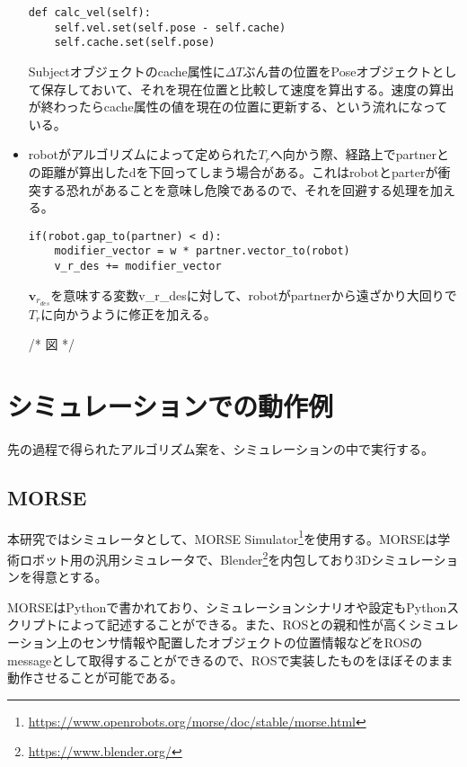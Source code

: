 \documentclass{kuisthesis}
\begin{document}
\begin{itemize}
\begin{lstlisting}
def calc_vel(self):
	self.vel.set(self.pose - self.cache)
	self.cache.set(self.pose)
\end{lstlisting}

Subjectオブジェクトのcache属性に$\Delta T$ぶん昔の位置をPoseオブジェクトとして保存しておいて、それを現在位置と比較して速度を算出する。速度の算出が終わったらcache属性の値を現在の位置に更新する、という流れになっている。

\vspace{1.0em}

\item robotがアルゴリズムによって定められた$T_r$へ向かう際、経路上でpartnerとの距離が算出したdを下回ってしまう場合がある。これはrobotとparterが衝突する恐れがあることを意味し危険であるので、それを回避する処理を加える。

\begin{lstlisting}
if(robot.gap_to(partner) < d):
	modifier_vector = w * partner.vector_to(robot)
	v_r_des += modifier_vector
\end{lstlisting}

$\bm{v}_r_{des}$を意味する変数v\_r\_desに対して、robotがpartnerから遠ざかり大回りで$T_r$に向かうように修正を加える。

/* 図 */

\end{itemize}




\section{シミュレーションでの動作例}

先の過程で得られたアルゴリズム案を、シミュレーションの中で実行する。

\subsection{MORSE}

本研究ではシミュレータとして、MORSE Simulator\footnote{\url{https://www.openrobots.org/morse/doc/stable/morse.html}}を使用する。MORSEは学術ロボット用の汎用シミュレータで、Blender\footnote{\url{https://www.blender.org/}}を内包しており3Dシミュレーションを得意とする。

MORSEはPythonで書かれており、シミュレーションシナリオや設定もPythonスクリプトによって記述することができる。また、ROSとの親和性が高くシミュレーション上のセンサ情報や配置したオブジェクトの位置情報などをROSのmessageとして取得することができるので、ROSで実装したものをほぼそのまま動作させることが可能である。
\end{document}
